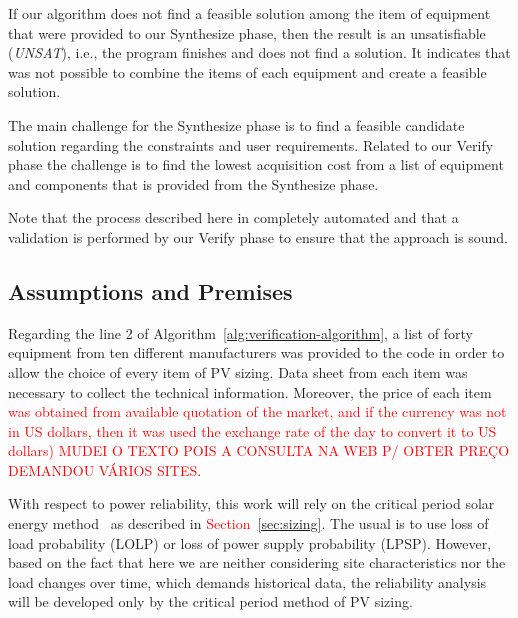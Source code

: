 \documentclass[review]{elsarticle}
\begin{document}
If our algorithm does not find a feasible solution among the item of equipment that were provided to our {\sc Synthesize} phase,  then the result is an unsatisfiable (\textit{UNSAT}), i.e., the program finishes and does not find a solution. It indicates that was not possible to combine the items of each equipment and create a feasible solution. 

The main challenge for the {\sc Synthesize} phase is to find a feasible candidate solution regarding the constraints and user requirements. Related to our {\sc Verify} phase the challenge is to find the lowest acquisition cost from a list of equipment and components that is provided from the {\sc Synthesize} phase. 

Note that the process described here in completely automated and that a validation is performed by our {\sc Verify} phase to ensure that the approach is sound.

\subsection{Assumptions and Premises}
Regarding the line 2 of Algorithm~\ref{alg:verification-algorithm}, a list of forty equipment from ten different manufacturers was provided to the code in order to allow the choice of every item of PV sizing. Data sheet from each item was necessary to collect the technical information. Moreover, the price of each item \textcolor{red}{was obtained from available quotation of the market, and if the currency was not in US dollars, then it was used the exchange rate of the day to convert it to US dollars) MUDEI O TEXTO POIS A CONSULTA NA WEB P/ OBTER PREÇO DEMANDOU VÁRIOS SITES}.

With respect to power reliability, this work will rely on the critical period solar energy method~\cite{Pinho} as described in \textcolor{red}{Section~\ref{sec:sizing}}. The usual is to use loss of load probability (LOLP) or loss of power supply probability (LPSP). However, based on the fact that here we are neither considering site characteristics nor the load changes over time, which demands historical data, the reliability analysis will be developed only by the critical period method of PV sizing.
\end{document}
